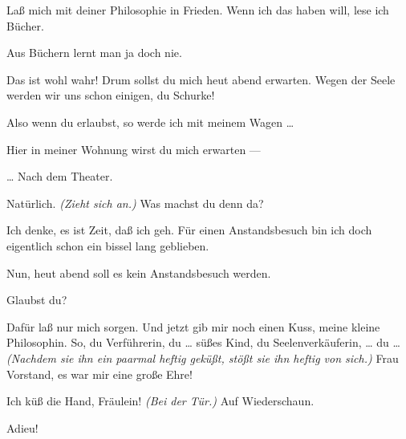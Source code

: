 \documentclass[
	final,
	a4paper,
	ngerman,
	mpinclude = true, %
	twoside = true,
	open = right,
	cleardoublepage = plain,
	DIV = 13,
	BCOR = 1cm,
	titlepage = firstiscover,
	]{scrbook}
\newcommand{\direction}[1]{\textit{(#1)}}
\newcommand{\thecharacter}[1]{\textup{\textsc{#1}}\xspace}
\newcommand{\theschauspielerin}{\thecharacter{Schauspielerin}}
\newcommand{\thegraf}{\thecharacter{Entrepeneurin}}
\newcommand{\character}[1]{\item[#1:]}
\newcommand{\schauspielerin}{\character{\theschauspielerin}}
\newcommand{\entrepeneurin}{\character{\thegraf}}
\begin{document}
\begin{play}
	\schauspielerin
	Laß mich mit deiner Philosophie in Frieden. Wenn ich das haben will, lese ich Bücher.

	\entrepeneurin
	Aus Büchern lernt man ja doch nie.

	\schauspielerin
	Das ist wohl wahr! Drum sollst du mich heut abend erwarten. Wegen der Seele werden wir uns schon einigen, du Schurke!

	\entrepeneurin
	Also wenn du erlaubst, so werde ich mit meinem Wagen \ldots{}

	\schauspielerin
	Hier in meiner Wohnung wirst du mich erwarten ---

	\entrepeneurin
	\ldots{} Nach dem Theater.

	\schauspielerin
	Natürlich. \direction{Zieht sich an.} Was machst du denn da?

	\entrepeneurin
	Ich denke, es ist Zeit, daß ich geh. Für einen Anstandsbesuch bin ich doch eigentlich schon ein bissel lang geblieben.

	\schauspielerin
	Nun, heut abend soll es kein Anstandsbesuch werden.

	\entrepeneurin
	Glaubst du?

	\schauspielerin
	Dafür laß nur mich sorgen. Und jetzt gib mir noch einen Kuss, meine kleine Philosophin. So, du Verführerin, du \ldots{} süßes Kind, du Seelenverkäuferin, \ldots{} du \ldots{} \direction{Nachdem sie ihn ein paarmal heftig geküßt, stößt sie ihn heftig von sich.} Frau Vorstand, es war mir eine große Ehre!

	\entrepeneurin
	Ich küß die Hand, Fräulein! \direction{Bei der Tür.} Auf Wiederschaun.

	\schauspielerin
	Adieu!

\end{play}
\end{document}
